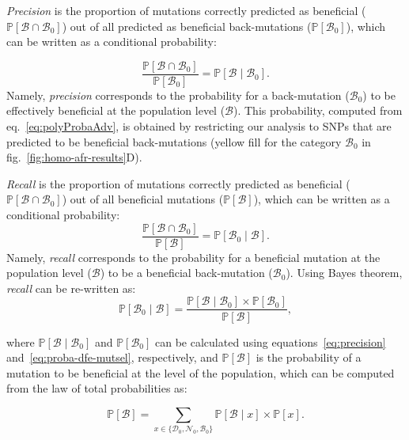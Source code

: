 \documentclass{article}
\newcommand{\proba}{\mathbb{P}}
\newcommand{\SphyDel}{\mathcal{D}_0}
\newcommand{\SphyNeu}{\mathcal{N}_0}
\newcommand{\SphyBen}{\mathcal{B}_0}
\newcommand{\Sphyclass}{x}
\newcommand{\given}{\mid}
\newcommand{\SpopBen}{\mathcal{B}}
\newcommand{\ProbaPopBen}{\proba [ \SpopBen ]}
\begin{document}
    \textit{Precision} is the proportion of mutations correctly predicted as beneficial ($\proba [ \SpopBen \cap  \SphyBen]$) out of all predicted as beneficial back-mutations ($\proba [ \SphyBen]$), which can be written as a conditional probability:

    \begin{equation}
        \frac{\proba [ \SpopBen  \cap  \SphyBen]}{\proba [ \SphyBen]} = \proba [ \SpopBen  \given  \SphyBen].
        \label{eq:precision}
    \end{equation}
    Namely, \textit{precision} corresponds to the probability for a back-mutation ($\SphyBen$) to be effectively beneficial at the population level ($\SpopBen$).
    This probability, computed from eq.~\ref{eq:polyProbaAdv}, is obtained by restricting our analysis to SNPs that are predicted to be beneficial back-mutations (yellow fill for the category $\SphyBen$ in fig.~\ref{fig:homo-afr-results}D).

    \textit{Recall} is the proportion of mutations correctly predicted as beneficial ($\proba [ \SpopBen \cap  \SphyBen]$) out of all beneficial mutations ($\proba [ \SpopBen]$), which can be written as a conditional probability:
    \begin{equation}
        \frac{\proba [ \SpopBen \cap  \SphyBen]}{\proba [ \SpopBen]} = \proba [ \SphyBen  \given \SpopBen ].
    \end{equation}
    Namely, \textit{recall} corresponds to the probability for a beneficial mutation at the population level ($\SpopBen$) to be a beneficial back-mutation ($\SphyBen$).
    Using Bayes theorem, \textit{recall} can be re-written as:
    \begin{equation}
        \proba [\SphyBen \given \SpopBen] = \frac{\proba [\SpopBen \given \SphyBen] \times \proba[\SphyBen]}{\ProbaPopBen},
        \label{eq:bayes}
    \end{equation}

    where $\proba [\SpopBen \given \SphyBen]$ and $\proba [ \SphyBen ]$ can be calculated using equations~\ref{eq:precision} and~\ref{eq:proba-dfe-mutsel}, respectively, and $\proba [ \SpopBen ]$ is the probability of a mutation to be beneficial at the level of the population, which can be computed from the law of total probabilities as:

    \begin{equation}
        \proba [ \SpopBen ] = \sum_{\Sphyclass \in \{\SphyDel, \SphyNeu, \SphyBen \} }\proba [\SpopBen \given \Sphyclass ] \times \proba [\Sphyclass ].
        \label{eq:total_proba}
    \end{equation}
    \printbibliography
\end{document}
